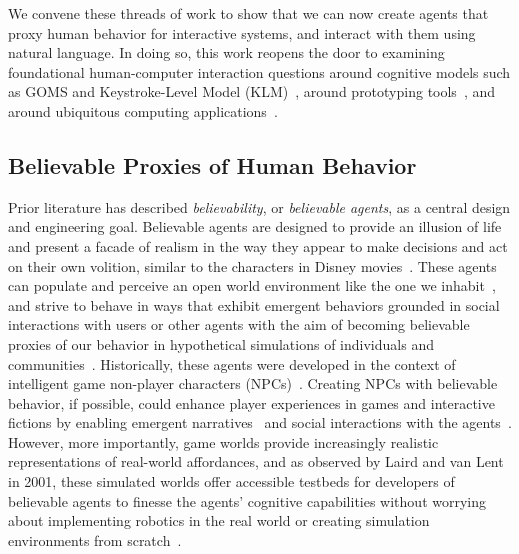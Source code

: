 We convene these threads of work to show that we can now create agents that proxy human behavior for interactive systems, and interact with them using natural language. In doing so, this work reopens the door to examining foundational human-computer interaction questions around cognitive models such as GOMS and Keystroke-Level Model (KLM)~\cite{card1983psychology,card1980keystroke}, around prototyping tools~\cite{9_park2022socialsimulacra}, and around ubiquitous computing applications~\cite{weiser1991computer,dey2001understanding,fast2016augur}.

\subsection{Believable Proxies of Human Behavior}
Prior literature has described \textit{believability}, or \textit{believable agents}, as a central design and engineering goal. Believable agents are designed to provide an illusion of life and present a facade of realism in the way they appear to make decisions and act on their own volition, similar to the characters in Disney movies~\cite{22_bates1994role, 42_Thomas1981Disney}. These agents can populate and perceive an open world environment like the one we inhabit~\cite{4_laird2001human, 22_bates1994role}, and strive to behave in ways that exhibit emergent behaviors grounded in social interactions with users or other agents with the aim of becoming believable proxies of our behavior in hypothetical simulations of individuals and communities~\cite{26_mccoy2012prom, 43_Burkinshaw2009Alice, 44_Francis2010Minecraft}. Historically, these agents were developed in the context of intelligent game non-player characters (NPCs)~\cite{4_laird2001human, 6_riedl2012interactive}. Creating NPCs with believable behavior, if possible, could enhance player experiences in games and interactive fictions by enabling emergent narratives~\cite{1_swartout2006toward, 2_aylett1999narrative, 3_brenner2010creating, ibister2000consistency} and social interactions with the agents~\cite{5_zubek2002towards}. However, more importantly, game worlds provide increasingly realistic representations of real-world affordances, and as observed by Laird and van Lent in 2001, these simulated worlds offer accessible testbeds for developers of believable agents to finesse the agents' cognitive capabilities without worrying about implementing robotics in the real world or creating simulation environments from scratch~\cite{4_laird2001human, 6_riedl2012interactive}.
 
